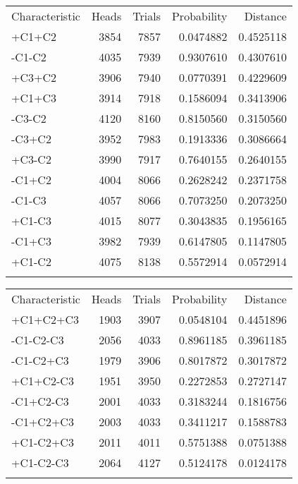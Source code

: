 \documentclass[
  ignorenonframetext,
]{beamer}
\renewcommand{\,}{\text{, }}
\begin{document}
\begin{frame}
\small

\begin{longtable}[]{@{}lrrrr@{}}
\toprule
Characteristic & Heads & Trials & Probability &
Distance \\ \addlinespace
\midrule
\endhead
+C1+C2 & 3854 & 7857 & 0.0474882 & 0.4525118 \\ \addlinespace
-C1-C2 & 4035 & 7939 & 0.9307610 & 0.4307610 \\ \addlinespace
+C3+C2 & 3906 & 7940 & 0.0770391 & 0.4229609 \\ \addlinespace
+C1+C3 & 3914 & 7918 & 0.1586094 & 0.3413906 \\ \addlinespace
-C3-C2 & 4120 & 8160 & 0.8150560 & 0.3150560 \\ \addlinespace
-C3+C2 & 3952 & 7983 & 0.1913336 & 0.3086664 \\ \addlinespace
+C3-C2 & 3990 & 7917 & 0.7640155 & 0.2640155 \\ \addlinespace
-C1+C2 & 4004 & 8066 & 0.2628242 & 0.2371758 \\ \addlinespace
-C1-C3 & 4057 & 8066 & 0.7073250 & 0.2073250 \\ \addlinespace
+C1-C3 & 4015 & 8077 & 0.3043835 & 0.1956165 \\ \addlinespace
-C1+C3 & 3982 & 7939 & 0.6147805 & 0.1147805 \\ \addlinespace
+C1-C2 & 4075 & 8138 & 0.5572914 & 0.0572914 \\ \addlinespace
\bottomrule
\end{longtable}
\end{frame}

\begin{frame}
\small

\begin{longtable}[]{@{}lrrrr@{}}
\toprule
Characteristic & Heads & Trials & Probability &
Distance \\ \addlinespace
\midrule
\endhead
+C1+C2+C3 & 1903 & 3907 & 0.0548104 & 0.4451896 \\ \addlinespace
-C1-C2-C3 & 2056 & 4033 & 0.8961185 & 0.3961185 \\ \addlinespace
-C1-C2+C3 & 1979 & 3906 & 0.8017872 & 0.3017872 \\ \addlinespace
+C1+C2-C3 & 1951 & 3950 & 0.2272853 & 0.2727147 \\ \addlinespace
-C1+C2-C3 & 2001 & 4033 & 0.3183244 & 0.1816756 \\ \addlinespace
-C1+C2+C3 & 2003 & 4033 & 0.3411217 & 0.1588783 \\ \addlinespace
+C1-C2+C3 & 2011 & 4011 & 0.5751388 & 0.0751388 \\ \addlinespace
+C1-C2-C3 & 2064 & 4127 & 0.5124178 & 0.0124178 \\ \addlinespace
\bottomrule
\end{longtable}
\end{frame}
\end{document}
